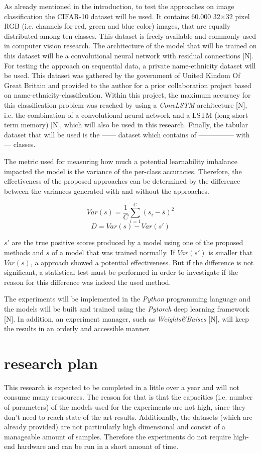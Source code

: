 \documentclass[journal]{IEEEtran}
\begin{document}
As already mentioned in the introduction, to test the approaches on image classification the CIFAR-10 dataset will be used.
It contains 60.000 32$\times$32 pixel RGB (i.e. channels for red, green and blue color) images, that are equally distributed among ten classes.
This dataset is freely available and commonly used in computer vision research.
The architecture of the model that will be trained on this dataset will be a convolutional neural network with residual connections [N].
For testing the approach on sequential data, a private name-ethnicity dataset will be used.
This dataset was gathered by the government of United Kindom Of Great Britain and provided to the author for a prior collaboration project based on name-ethnicity-classification.
Within this project, the maximum accuracy for this classification problem was reached by using a \emph{ConvLSTM} architecture [N], i.e. the combination of a convolutional neural network and a LSTM (long-short term memory) [N], which will also be used in this research. 
Finally, the tabular dataset that will be used is the ------ dataset which contains of --------------- with --- classes.

The metric used for measuring how much a potential learnability imbalance impacted the model is the variance of the per-class accuracies.
Therefore, the effectiveness of the proposed approaches can be determined by the difference between the variances generated with and without the approaches.

\[ Var(s) = \frac{1}{C} \sum_{i=1}^{C} (s_i - \bar{s})^2 \]
\[ D = Var(s) - Var(s') \]

$s'$ are the true positive scores produced by a model using one of the proposed methods and $s$ of a model that was trained normally. 
If $Var(s')$ is smaller that $Var(s)$, a approach showed a potential effectiveness.
But if the difference is not significant, a statistical test must be performed in order to investigate if the reason for this difference was indeed the used method.

The experiments will be implemented in the \emph{Python} programming language and the models will be built and trained using the \emph{Pytorch} deep learning framework [N].
In addition, an experiment manager, such as \emph{Weights\&Baises} [N], will keep the results in an orderly and accessible manner.

\section{research plan}
This research is expected to be completed in a little over a year and will not consume many ressources.
The reason for that is that the capacities (i.e. number of parameters) of the models used for the experiments are not high, since they don't need to reach state-of-the-art results.
Additionally, the datasets (which are already provided) are not particularly high dimensional and consist of a manageable amount of samples.
Therefore the experiments do not require high-end hardware and can be run in a short amount of time.
\end{document}
